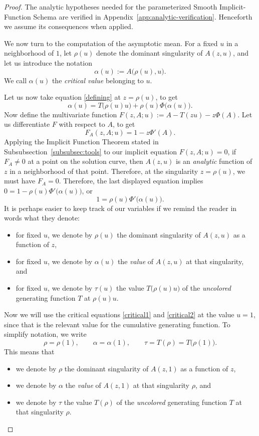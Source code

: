 \documentclass[11pt, onesided]{amsart}
\theoremstyle{remark}
\begin{document}
\begin{proof}
The analytic hypotheses needed for the parameterized Smooth
Implicit-Function Schema are verified in
Appendix~\ref{app:analytic-verification}. Henceforth we assume its consequences when applied.

We now turn to the computation of the asymptotic mean.  For a fixed \(u\) in a neighborhood of \(1\), let \(\rho(u)\) denote the
dominant singularity of \(A(z,u)\), and let us introduce the notation
\[
\alpha(u):=A\big(\rho(u),u\big). 
\]
We call $\alpha(u)$ the {\em critical value} belonging to $u$. 

Let us now take equation \eqref{defining} at $z=\rho(u)$, to get
\begin{equation}
\label{critical1}
	\alpha(u) = T\big(\rho(u)u\big)+\rho(u)\Phi\big(\alpha(u)\big).
\end{equation} 
Now define the multivariate function $F(z, A; u):=A-T(zu)-z\Phi(A)$.
Let us differentiate $F$ with respect to $A$, to get 
\[F_A(z,A;u)=1-z\Phi'(A).\]
Applying the Implicit Function Theorem stated in Subsubsection~\ref{subsubsec:tools} to our implicit equation $F(z,A;u)=0$, if $F_A\neq 0$ at a point on the solution curve, then $A(z,u)$ is an {\em analytic} function of $z$ in a neighborhood of that point.
Therefore, at the singularity $z=\rho(u)$, we must have $F_A=0$. Therefore, the last displayed equation implies
$0=1-\rho(u)\Phi'\big(\alpha(u)\big)$, or
\begin{equation}  
1
=
\rho(u)\Phi'\big(\alpha(u)\big).
\label{critical2}
\end{equation}
It is perhaps easier to keep track of our variables if we remind the reader in words what they denote:
\begin{itemize}
\item for fixed $u$, we denote by $\rho(u)$  the dominant singularity of $A(z,u)$ as a function of $z$,
\item for fixed $u$, we denote by $\alpha(u)$ the {\em value} of $A(z,u)$ at that singularity, and
\item for fixed $u$, we denote by $\tau(u)$ the value $T\big(\rho(u)u\big)$ of the {\em uncolored} generating function $T$ at $\rho(u)u$.
\end{itemize}

Now we will use the critical equations \eqref{critical1} and \eqref{critical2} at the value $u=1$, since
that is the relevant value for the cumulative generating function.
To simplify notation, we   write
\[
\rho=\rho(1),\qquad
\alpha=\alpha(1),\qquad
\tau=T(\rho)=T\big(\rho(1)\big).
\]
This means that
\begin{itemize}
\item we denote by $\rho$  the dominant singularity of $A(z,1)$ as a function of $z$,
\item  we denote by $\alpha$ the {\em value} of $A(z,1)$ at that singularity $\rho$, and
\item  we denote by $\tau$ the value $T(\rho)$ of the {\em uncolored} generating function $T$ at that singularity $\rho$.
\end{itemize}


\end{proof}
\end{document}
